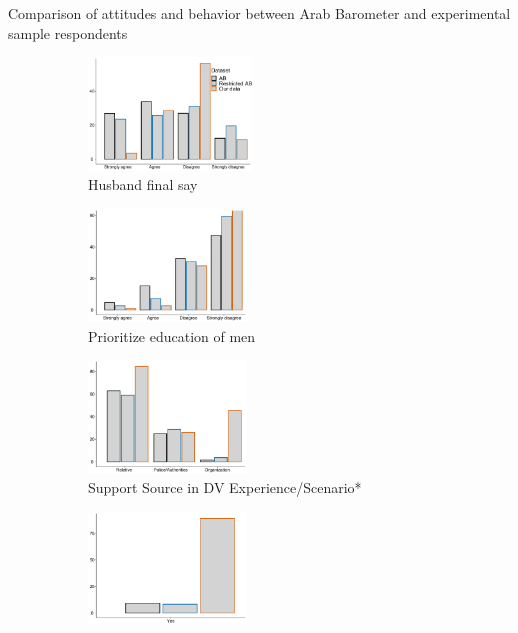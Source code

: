 \documentclass[10pt]{beamer}
\begin{document}
\begin{frame}{Comparison of attitudes and behavior between Arab Barometer and experimental sample respondents}
\begin{figure}[H]
\caption{Comparison of Attitudes and Behavior with general (Arab Barometer) population \\}
   \begin{minipage}{0.8\textwidth} 
\begin{subfigure}{0.5\textwidth}
  \includegraphics[height=3cm,width=4cm\linewidth]{Figures/AB/grey_solid/husb_fs.pdf} 
    \caption{Husband final say} 
    \label{} 
\end{subfigure}\hfil
\begin{subfigure}{0.5\textwidth}
  \includegraphics[height=3cm,width=4cm\linewidth]{Figures/AB/grey_solid/prio_educ.pdf} 
    \caption{Prioritize education of men} 
    \label{} 
\end{subfigure}\hfil
\begin{subfigure}{0.5\textwidth}
  \includegraphics[height=3cm,width=4cm\linewidth]{Figures/AB/grey_solid/support.pdf} 
    \caption{Support Source in DV Experience/Scenario*} 
    \label{} 
    \end{subfigure}\hfil
    \begin{subfigure}{0.5\textwidth}
    \includegraphics[height=3cm,width=4cm\linewidth]{Figures/AB/grey_solid/violence.pdf} 

\end{subfigure}
\end{minipage}
\end{figure}
\end{frame}
\end{document}
